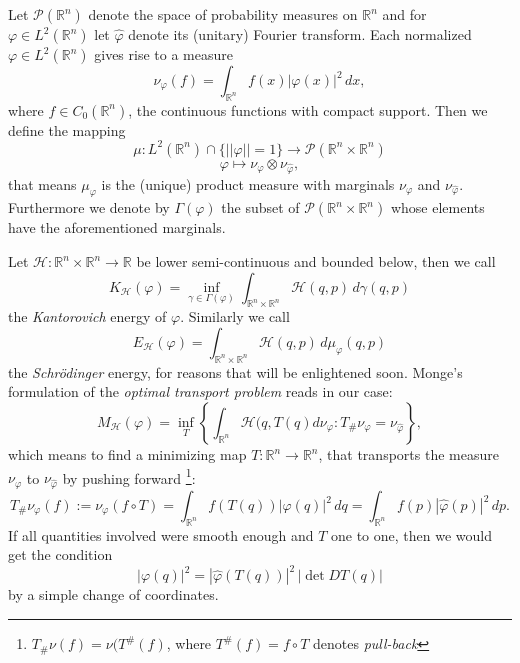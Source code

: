 \documentclass[12pt,a4paper]{article}
\newcommand{\RR}[1]{\mathbb{R}^#1}
\newcommand{\LL}[1]{L^2(\RR{#1})}
\newcommand{\Prob}[1]{\mathcal{P}({\RR #1})}
\newcommand{\Probc}[1]{\mathcal{P}({\RR #1 \times \RR #1})}
\newcommand{\HH}{\mathcal{H}}
\begin{document}
Let $\Prob{n}$ denote the space of probability measures on $\RR n$ and for
$\varphi\in\LL{n}$ let $\hat\varphi$ denote its (unitary) Fourier transform.
Each normalized $\varphi\in\LL{n}$ gives rise to a measure
\begin{displaymath}
   \nu_{\varphi}(f)=\int_{\RR n} f(x) |\varphi(x)|^2 \,dx,
\end{displaymath}
where $f\in C_{0}(\RR n)$, the continuous functions with compact support. Then
we define the mapping
\begin{equation}
   \mu : \LL{n}\cap\{||\varphi||=1\} \longrightarrow \Probc{n} 
\end{equation}
\begin{displaymath}
   \varphi \longmapsto \nu_{\varphi}\otimes\nu_{\hat\varphi},
\end{displaymath}
that means $\mu_{\varphi}$ is the (unique) product measure with marginals 
$\nu_{\varphi}$ and $\nu_{\hat\varphi}$. Furthermore we denote by $\Gamma(\varphi)$
the subset of $\Probc{n}$ whose elements have the aforementioned marginals.

Let $\HH:\RR{n}\times\RR{n}\longrightarrow\mathbb{R}$ be lower semi-continuous
and bounded below, then we call
\begin{equation}
       K_\HH(\varphi) = \inf_{\gamma\in\Gamma(\varphi)} 
          \int_{\RR{n} \times \RR{n}} \HH(q,p) \,d\gamma(q,p)
\end{equation}\label{KantEnergy}
the {\sl Kantorovich} energy of $\varphi$. Similarly we call
\begin{equation}
      E_\HH(\varphi) = \int_{\RR{n} \times \RR{n}} \HH(q,p) \, d\mu_{\varphi}(q,p)
\end{equation}\label{SchroedEnergy}
the {\sl Schr\"odinger} energy, for reasons that will be enlightened soon. 
Monge's formulation of the {\sl optimal transport problem} reads in our case:
\begin{equation}
   M_\HH(\varphi)=\inf_{T} \left\{\int_{\RR n} \HH(q,T(q) d\nu_{\varphi} : 
       T_\# \nu_{\varphi} = \nu_{\hat\varphi} \right\},
\end{equation}
which means to find a minimizing map $T:{\RR n}\rightarrow \RR{n}$, that 
transports the measure $\nu_\varphi$ to $\nu_{\hat\varphi}$ by pushing forward
\footnote{$T_\#\nu(f)=\nu(T^\#(f)$, where $T^\#(f)=f\circ T$ denotes {\sl pull-back}}:
\begin{displaymath}
     T_\# \nu_{\varphi}(f):=\nu_{\varphi}(f\circ T)=
        \int_{\RR n} f(T(q)) |\varphi(q)|^2 \,dq 
          = \int_{\RR n} f(p) |\hat\varphi(p)|^2 \,dp.
\end{displaymath}
If all quantities involved were smooth enough and $T$ one to one, then we would get 
the condition
\begin{equation}\label{MAEQ}
     |\varphi(q)|^2 = |\hat\varphi(T(q))|^2\, |\det{DT(q)}|
\end{equation}
by a simple change of coordinates.
%
\end{document}
